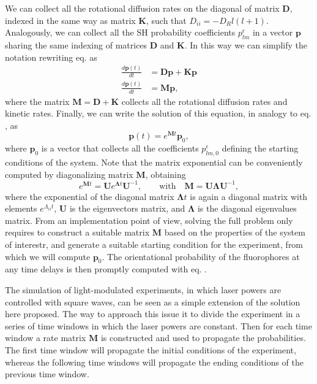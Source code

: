 \documentclass{article}
\begin{document}
We can collect all the rotational diffusion rates on the diagonal of matrix $\mathbf{D}$, indexed in the same way as matrix $\mathbf{K}$, such that $D_{ii} = -D_R l(l+1)$. Analogously, we can collect all the SH probability coefficients $p^\epsilon_{lm}$ in a vector $\mathbf{p}$ sharing the same indexing of matrices $\mathbf{D}$ and $\mathbf{K}$. In this way we can simplify the notation rewriting eq.  as
\begin{equation}
\begin{aligned}
    \frac{d \mathbf{p}(t) }{dt} &=
    \mathbf{D}\mathbf{p} + \mathbf{K}\mathbf{p} \\
    \frac{d \mathbf{p}(t)}{dt} &=
    \mathbf{M}\mathbf{p},
\end{aligned}
\end{equation}
where the matrix $\mathbf{M} = \mathbf{D} + \mathbf{K}$ collects all the rotational diffusion rates and kinetic rates. Finally, we can write the solution of this equation, in analogy to eq. , as
\begin{equation}\label{eq:full_solution}
    \mathbf{p}(t) = e^{\mathbf{M}t} \mathbf{p}_0,
\end{equation}
where $\mathbf{p}_0$ is a vector that collects all the coefficients $p^\epsilon_{lm,0}$ defining the starting conditions of the system. Note that the matrix exponential can be conveniently computed by diagonalizing matrix $\mathbf{M}$, obtaining
\begin{equation}
    e^{\mathbf{M}t} = \mathbf{U} e^{\mathbf{\Lambda} t} \mathbf{U}^{-1}, 
    \qquad \text{with} \quad
    \mathbf{M} = \mathbf{U} \mathbf{\Lambda} \mathbf{U}^{-1},
\end{equation}
where the exponential of the diagonal matrix $\mathbf{\Lambda}t$ is again a diagonal matrix with elements $e^{\Lambda_{ii}t}$, $\mathbf{U}$ is the eigenvectors matrix, and $\mathbf{\Lambda}$ is the diagonal eigenvalues matrix. From an implementation point of view, solving the full problem only requires to construct a suitable matrix $\mathbf{M}$ based on the properties of the system of interestr, and generate a suitable starting condition for the experiment, from which we will compute $\mathbf{p}_0$. The orientational probability of the fluorophores at any time delays is then promptly computed with eq. .

The simulation of light-modulated experiments, in which laser powers are controlled with square waves, can be seen as a simple extension of the solution here proposed. The way to approach this issue it to divide the experiment in a series of time windows in which the laser powers are constant. Then for each time window a rate matrix $\mathbf{M}$ is constructed and used to propagate the probabilities. The first time window will propagate the initial conditions of the experiment, whereas the following time windows will propagate the ending conditions of the previous time window.
\end{document}
